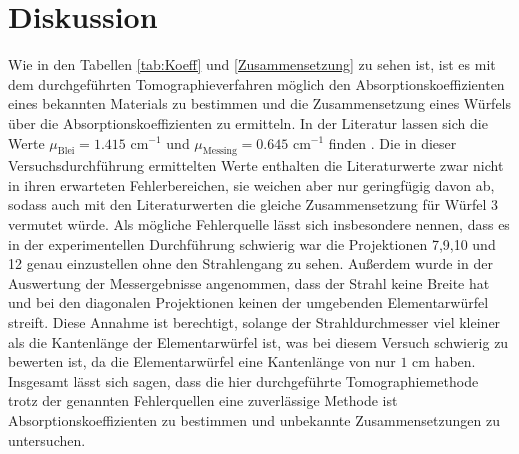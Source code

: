

\section{Diskussion}
Wie in den Tabellen \ref{tab:Koeff} und \ref{Zusammensetzung} zu sehen ist, ist es mit dem 
durchgeführten Tomographieverfahren 
möglich den Absorptionskoeffizienten eines bekannten Materials zu bestimmen und die 
Zusammensetzung eines Würfels über die Absorptionskoeffizienten zu ermitteln. In der Literatur 
lassen sich die Werte $\mu_\text{Blei}=1.415\text{ cm}^{-1}$ und $\mu_\text{Messing}=0.645\text{ 
cm}^{-1}$ finden \cite{Internet}. Die in dieser Versuchsdurchführung ermittelten Werte enthalten 
die Literaturwerte zwar nicht in ihren erwarteten Fehlerbereichen, sie weichen aber nur 
geringfügig davon ab, sodass auch mit den Literaturwerten die gleiche Zusammensetzung für Würfel 
3 vermutet würde. Als mögliche Fehlerquelle lässt sich insbesondere nennen, dass es in der 
experimentellen Durchführung schwierig war die Projektionen 7,9,10 und 12 genau einzustellen ohne 
den Strahlengang zu sehen. Außerdem wurde in der Auswertung der Messergebnisse angenommen, dass 
der Strahl keine Breite hat und bei den diagonalen Projektionen keinen der umgebenden 
Elementarwürfel streift. Diese Annahme ist berechtigt, solange der Strahldurchmesser viel 
kleiner als die Kantenlänge der Elementarwürfel ist, was bei diesem Versuch schwierig zu 
bewerten ist, da die Elementarwürfel eine Kantenlänge von nur $1$ cm haben.\\
Insgesamt lässt sich sagen, dass die hier durchgeführte Tomographiemethode trotz der genannten 
Fehlerquellen eine zuverlässige Methode ist Absorptionskoeffizienten zu bestimmen und unbekannte 
Zusammensetzungen zu untersuchen.
